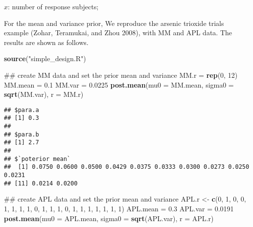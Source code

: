 \documentclass[]{article}
\newenvironment{Shaded}{\begin{snugshade}}{\end{snugshade}}
\newcommand{\KeywordTok}[1]{\textcolor[rgb]{0.13,0.29,0.53}{\textbf{{#1}}}}
\newcommand{\DataTypeTok}[1]{\textcolor[rgb]{0.13,0.29,0.53}{{#1}}}
\newcommand{\DecValTok}[1]{\textcolor[rgb]{0.00,0.00,0.81}{{#1}}}
\newcommand{\FloatTok}[1]{\textcolor[rgb]{0.00,0.00,0.81}{{#1}}}
\newcommand{\StringTok}[1]{\textcolor[rgb]{0.31,0.60,0.02}{{#1}}}
\newcommand{\NormalTok}[1]{{#1}}
\begin{document}
\(x\): number of response subjects;

For the mean and variance prior, We reproduce the arsenic trioxide
trials example (Zohar, Teramukai, and Zhou 2008), with MM and APL data.
The results are shown as follows.

\begin{Shaded}
\begin{Highlighting}[]
\KeywordTok{source}\NormalTok{(}\StringTok{"simple_design.R"}\NormalTok{)}
\end{Highlighting}
\end{Shaded}

\begin{Shaded}
\begin{Highlighting}[]
\NormalTok{## create MM data and set the prior mean and variance}
\NormalTok{MM.r =}\StringTok{ }\KeywordTok{rep}\NormalTok{(}\DecValTok{0}\NormalTok{, }\DecValTok{12}\NormalTok{)}
\NormalTok{MM.mean =}\StringTok{ }\FloatTok{0.1}
\NormalTok{MM.var =}\StringTok{ }\FloatTok{0.0225}
\KeywordTok{post.mean}\NormalTok{(}\DataTypeTok{mu0 =} \NormalTok{MM.mean, }\DataTypeTok{sigma0 =} \KeywordTok{sqrt}\NormalTok{(MM.var), }\DataTypeTok{r =} \NormalTok{MM.r)}
\end{Highlighting}
\end{Shaded}

\begin{verbatim}
## $para.a
## [1] 0.3
## 
## $para.b
## [1] 2.7
## 
## $`poterior mean`
##  [1] 0.0750 0.0600 0.0500 0.0429 0.0375 0.0333 0.0300 0.0273 0.0250 0.0231
## [11] 0.0214 0.0200
\end{verbatim}

\begin{Shaded}
\begin{Highlighting}[]
\NormalTok{## create APL data and set the prior mean and variance}
\NormalTok{APL.r <-}\StringTok{ }\KeywordTok{c}\NormalTok{(}\DecValTok{0}\NormalTok{, }\DecValTok{1}\NormalTok{, }\DecValTok{0}\NormalTok{, }\DecValTok{0}\NormalTok{, }\DecValTok{1}\NormalTok{, }\DecValTok{1}\NormalTok{, }\DecValTok{1}\NormalTok{, }\DecValTok{1}\NormalTok{, }\DecValTok{0}\NormalTok{, }\DecValTok{1}\NormalTok{, }\DecValTok{1}\NormalTok{, }\DecValTok{1}\NormalTok{, }\DecValTok{0}\NormalTok{, }\DecValTok{1}\NormalTok{, }\DecValTok{1}\NormalTok{, }\DecValTok{1}\NormalTok{, }\DecValTok{1}\NormalTok{, }\DecValTok{1}\NormalTok{, }\DecValTok{1}\NormalTok{, }\DecValTok{1}\NormalTok{)}
\NormalTok{APL.mean =}\StringTok{ }\FloatTok{0.3}
\NormalTok{APL.var =}\StringTok{ }\FloatTok{0.0191}
\KeywordTok{post.mean}\NormalTok{(}\DataTypeTok{mu0 =} \NormalTok{APL.mean, }\DataTypeTok{sigma0 =} \KeywordTok{sqrt}\NormalTok{(APL.var), }\DataTypeTok{r =} \NormalTok{APL.r)}
\end{Highlighting}
\end{Shaded}
\end{document}
